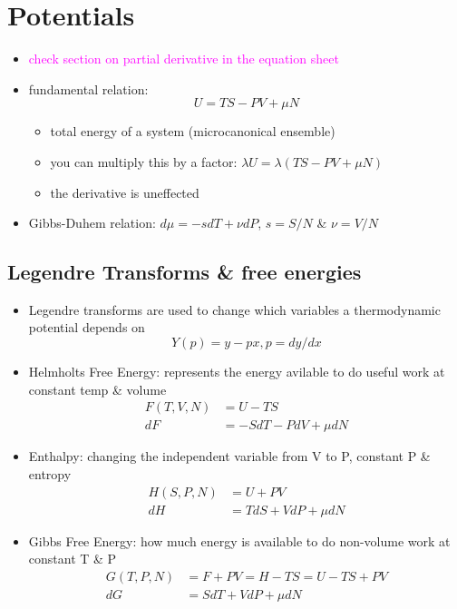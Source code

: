 
\section{Potentials}


\begin{itemize}
	\item \textcolor{magenta}{check section on partial derivative in the equation sheet}
	\item fundamental relation:
	      \begin{equation}
		      U = TS - PV + \mu N
	      \end{equation}
	      \begin{itemize}
		      \item total energy of a system (microcanonical ensemble)
		      \item you can multiply this by a factor: $\lambda U = \lambda (TS - PV + \mu N)$
		      \item the derivative is uneffected
	      \end{itemize}
	\item Gibbs-Duhem relation: $d\mu = -s dT + \nu dP$, $s = S/N$ \& $\nu = V/N$
\end{itemize}

\subsection*{Legendre Transforms \& free energies}
\begin{itemize}
	\item Legendre transforms are used to change which variables a thermodynamic potential depends on
	      \begin{equation*}
		      Y(p) = y - px, p = dy/dx
	      \end{equation*}
	\item Helmholts Free Energy: represents the energy avilable to do useful work at constant temp \& volume
	      \begin{align*}
		      F(T,V, N) & = U - TS                \\
		      dF        & = -S dT - P dV + \mu dN
	      \end{align*}

	\item Enthalpy: changing the independent variable from V to P, constant P \& entropy
	      \begin{align*}
		      H(S, P, N) & = U + PV               \\
		      dH         & = T dS + V dP + \mu dN
	      \end{align*}

	\item Gibbs Free Energy: how much energy is available to do non-volume work at constant T \& P
	      \begin{align*}
		      G(T, P, N) & = F + PV = H - TS = U -TS + PV \\
		      dG         & = S dT + V dP + \mu dN
	      \end{align*}

\end{itemize}

